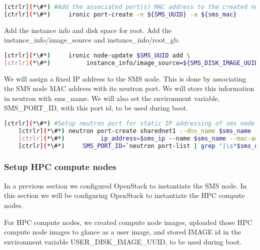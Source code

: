 
\begin{lstlisting}[language=bash,keywords={}]
[ctrlr](*\#*) #Add the associated port(s) MAC address to the created node(s)
[ctrlr](*\#*)     ironic port-create -n ${SMS_UUID} -a ${sms_mac}
\end{lstlisting} 

Add the instance info and disk space for root. \newline
	Add the instance\_info/image\_source and instance\_info/root\_gb.
    

\begin{lstlisting}[language=bash,keywords={}]
[ctrlr](*\#*)     ironic node-update $SMS_UUID add \
[ctrlr](*\#*)          instance_info/image_source=${SMS_DISK_IMAGE_UUID} instance_info/root_gb=50
\end{lstlisting} 


	We will assign a fixed IP address to the SMS node. This is done by associating the SMS node MAC address with its neutron port. We will store this information in neutron with sms\_name. We will also set the environment variable, SMS\_PORT\_ID, with this port id, to be used during boot.

    
    \begin{lstlisting}[language=bash,keywords={}]
    [ctrlr](*\#*) #Setup neutron port for static IP addressing of sms node.
    [ctrlr](*\#*) neutron port-create sharednet1 --dns_name $sms_name --fixed-ip \
    [ctrlr](*\#*)          ip_address=$sms_ip --name $sms_name --mac-address $sms_mac
    [ctrlr](*\#*)     SMS_PORT_ID=`neutron port-list | grep "|\s*$sms_name\s*|" | awk '{print $2}'`
	\end{lstlisting} 

\newpage
\subsubsection{Setup HPC compute nodes}

	In a previous section we configured OpenStack to instantiate the SMS node. In this section we will be configuring OpenStack to instantiate the HPC compute nodes.

	For HPC compute nodes, we created compute node images, uploaded those HPC compute node images to glance as a user image, and stored IMAGE id in the environment variable USER\_DISK\_IMAGE\_UUID, to be used during boot.

